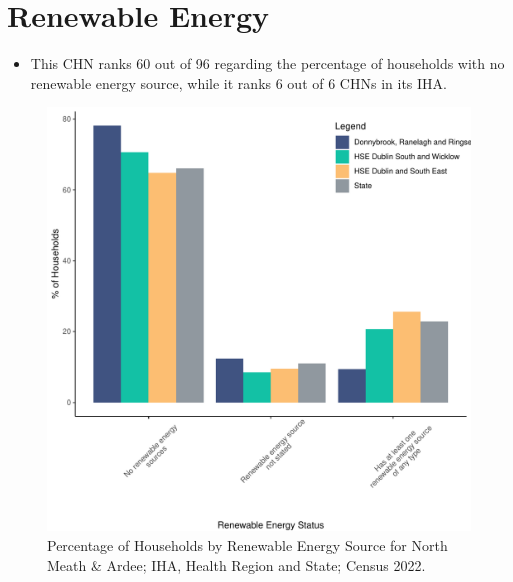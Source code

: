 \documentclass{article}
\begin{document}
\section{Renewable Energy}\label{sect:RE}
\begin{itemize}
\item This CHN ranks  60 out of 96 regarding the percentage of households with no renewable energy source, while it ranks   6 out of 6 CHNs in its IHA.
\end{itemize}
\begin{figure}[H]
	\centering
	\includegraphics[width = 140mm]{../figures/RenewableEnergyED.pdf}
	\caption{Percentage of Households by Renewable Energy Source for North Meath & Ardee; IHA, Health Region and State; Census 2022.}
	\label{fig:vbnv}
	\end{figure}
\end{document}
